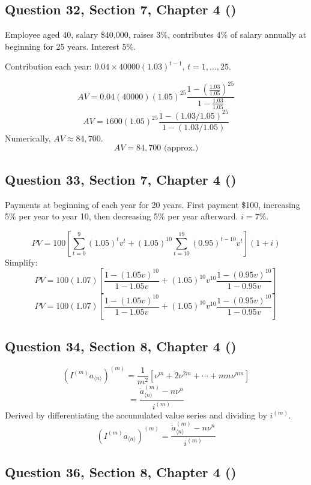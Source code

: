 \documentclass[12pt, a4paper]{article}
\newcommand{\angl}[1]{\langle #1 \rangle}
\begin{document}
\subsection*{Question 32, Section 7, Chapter 4  (\cite{toi3rd})}

Employee aged 40, salary \$40,000, raises 3\%, contributes 4\% of salary annually at beginning for 25 years.  
Interest 5\%.

Contribution each year: \( 0.04 \times 40000 (1.03)^{t-1} \), \(t=1,\dots,25\).

\[
AV = 0.04(40000)(1.05)^{25} \frac{1 - \left(\frac{1.03}{1.05}\right)^{25}}{1 - \frac{1.03}{1.05}}
\]
\[
\boxed{AV = 1600(1.05)^{25} \frac{1 - (1.03/1.05)^{25}}{1 - (1.03/1.05)}}
\]
Numerically, \( AV \approx 84{,}700 \).
\[
\boxed{AV = 84{,}700 \text{ (approx.)}}
\]

\subsection*{Question 33, Section 7, Chapter 4  (\cite{toi3rd})}

Payments at beginning of each year for 20 years.  
First payment \$100, increasing 5\% per year to year 10, then decreasing 5\% per year afterward.  
\(i = 7\%\).

\[
PV = 100 \left[\sum_{t=0}^{9} (1.05)^t v^t + (1.05)^{10} \sum_{t=10}^{19} (0.95)^{t-10} v^t \right] (1+i)
\]
Simplify:
\[
PV = 100(1.07)\left[\frac{1 - (1.05v)^{10}}{1 - 1.05v} + (1.05)^{10} v^{10} \frac{1 - (0.95v)^{10}}{1 - 0.95v}\right]
\]
\[
\boxed{PV = 100(1.07)\left[\frac{1 - (1.05v)^{10}}{1 - 1.05v} + (1.05)^{10} v^{10} \frac{1 - (0.95v)^{10}}{1 - 0.95v}\right]}
\]

\subsection*{Question 34, Section 8, Chapter 4  (\cite{toi3rd})}

\[
(I^{(m)} a_{\angl{n}})^{(m)} = \frac{1}{m^2}\left[\nu^m + 2\nu^{2m} + \cdots + n m \nu^{n m}\right]
\]
\[
= \frac{\ddot{a}_{\angl{n}}^{(m)} - n\nu^n}{i^{(m)}}
\]
Derived by differentiating the accumulated value series and dividing by \(i^{(m)}\).
\[
\boxed{(I^{(m)} a_{\angl{n}})^{(m)} = \frac{\ddot{a}_{\angl{n}}^{(m)} - n\nu^n}{i^{(m)}}}
\]

\subsection*{Question 36, Section 8, Chapter 4  (\cite{toi3rd})}
\end{document}
